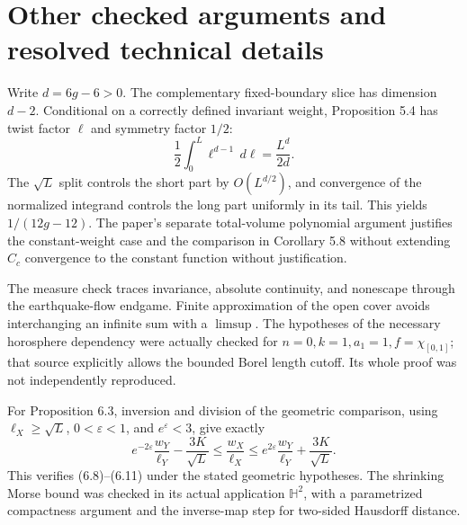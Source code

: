 \documentclass[10pt]{article}
\begin{document}
\section*{Other checked arguments and resolved technical details}
Write \(d=6g-6>0\). The complementary fixed-boundary slice has dimension \(d-2\). Conditional on a correctly defined invariant weight, Proposition 5.4 has twist factor \(\ell\) and symmetry factor \(1/2\): \[\frac12\int_0^L\ell^{d-1}\,d\ell=\frac{L^d}{2d}.\] The \(\sqrt L\) split controls the short part by \(O(L^{d/2})\), and convergence of the normalized integrand controls the long part uniformly in its tail. This yields \(1/(12g-12)\). The paper’s separate total-volume polynomial argument justifies the constant-weight case and the comparison in Corollary 5.8 without extending \(C_c\) convergence to the constant function without justification.\par
The measure check traces invariance, absolute continuity, and nonescape through the earthquake-flow endgame. Finite approximation of the open cover avoids interchanging an infinite sum with a \(\limsup\). The hypotheses of the necessary horosphere dependency were actually checked for \(n=0,k=1,a_1=1,f=\chi_{[0,1]}\); that source explicitly allows the bounded Borel length cutoff. Its whole proof was not independently reproduced.\par
For Proposition 6.3, inversion and division of the geometric comparison, using \(\ell_X\ge\sqrt L\), \(0<\varepsilon<1\), and \(e^\varepsilon<3\), give exactly \[e^{-2\varepsilon}\frac{w_Y}{\ell_Y}-\frac{3K}{\sqrt L}
 \le\frac{w_X}{\ell_X}\le
 e^{2\varepsilon}\frac{w_Y}{\ell_Y}+\frac{3K}{\sqrt L}.\] This verifies (6.8)–(6.11) under the stated geometric hypotheses. The shrinking Morse bound was checked in its actual application \(\mathbb H^2\), with a parametrized compactness argument and the inverse-map step for two-sided Hausdorff distance.\par
\end{document}

